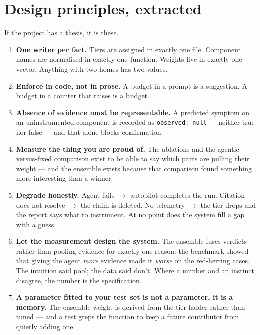 \documentclass[11pt,a4paper]{article}
\newcommand{\code}[1]{\texttt{\small #1}}
\begin{document}
\section{Design principles, extracted}

If the project has a thesis, it is these.

\begin{enumerate}[leftmargin=1.6em]
  \item \textbf{One writer per fact.} Tiers are assigned in exactly one file.
  Component names are normalised in exactly one function. Weights live in exactly
  one vector. Anything with two homes has two values.

  \item \textbf{Enforce in code, not in prose.} A budget in a prompt is a
  suggestion. A budget in a counter that raises is a budget.

  \item \textbf{Absence of evidence must be representable.} A predicted symptom
  on an uninstrumented component is recorded as \code{observed: null} --- neither
  true nor false --- and that alone blocks confirmation.

  \item \textbf{Measure the thing you are proud of.} The ablations and the
  agentic-versus-fixed comparison exist to be able to say which parts are pulling
  their weight --- and the ensemble exists because that comparison found
  something more interesting than a winner.

  \item \textbf{Degrade honestly.} Agent fails $\rightarrow$ autopilot completes
  the run. Citation does not resolve $\rightarrow$ the claim is deleted. No
  telemetry $\rightarrow$ the tier drops and the report says what to instrument.
  At no point does the system fill a gap with a guess.

  \item \textbf{Let the measurement design the system.} The ensemble fuses
  verdicts rather than pooling evidence for exactly one reason: the benchmark
  showed that giving the agent \emph{more} evidence made it \emph{worse} on the
  red-herring cases. The intuition said pool; the data said don't. Where a number
  and an instinct disagree, the number is the specification.

  \item \textbf{A parameter fitted to your test set is not a parameter, it is a
  memory.} The ensemble weight is derived from the tier ladder rather than tuned
  --- and a test greps the function to keep a future contributor from quietly
  adding one.
\end{enumerate}
\end{document}
